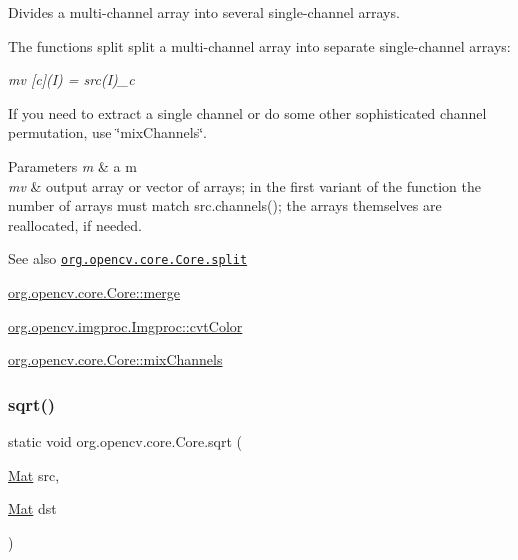 Divides a multi-\/channel array into several single-\/channel arrays.

The functions {\ttfamily split} split a multi-\/channel array into separate single-\/channel arrays\+:

{\itshape mv \mbox{[}c\mbox{]}(I) = src(\+I)\+\_\+c}

If you need to extract a single channel or do some other sophisticated channel permutation, use \char`\"{}mix\+Channels\char`\"{}.


\begin{DoxyParams}{Parameters}
{\em m} & a m \\
\hline
{\em mv} & output array or vector of arrays; in the first variant of the function the number of arrays must match {\ttfamily src.\+channels()}; the arrays themselves are reallocated, if needed.\\
\hline
\end{DoxyParams}
\begin{DoxySeeAlso}{See also}
\href{http://docs.opencv.org/modules/core/doc/operations_on_arrays.html#split}{\tt org.\+opencv.\+core.\+Core.\+split} 

\mbox{\hyperlink{classorg_1_1opencv_1_1core_1_1_core_af245932b4a6d1aee20be9610388bb06a}{org.\+opencv.\+core.\+Core\+::merge}} 

\mbox{\hyperlink{classorg_1_1opencv_1_1imgproc_1_1_imgproc_ab8fb70fea379b4215a77122d698d860d}{org.\+opencv.\+imgproc.\+Imgproc\+::cvt\+Color}} 

\mbox{\hyperlink{classorg_1_1opencv_1_1core_1_1_core_a812a71941c37c615cb474bff0eacbb2e}{org.\+opencv.\+core.\+Core\+::mix\+Channels}} 
\end{DoxySeeAlso}
\mbox{\label{classorg_1_1opencv_1_1core_1_1_core_a5a2235761d8876294b3277876479107b}} 
\subsubsection{\texorpdfstring{sqrt()}{sqrt()}}
{\footnotesize\ttfamily static void org.\+opencv.\+core.\+Core.\+sqrt (\begin{DoxyParamCaption}\item[{\mbox{\hyperlink{classorg_1_1opencv_1_1core_1_1_mat}{Mat}}}]{src,  }\item[{\mbox{\hyperlink{classorg_1_1opencv_1_1core_1_1_mat}{Mat}}}]{dst }\end{DoxyParamCaption})\hspace{0.3cm}{\ttfamily [static]}}

